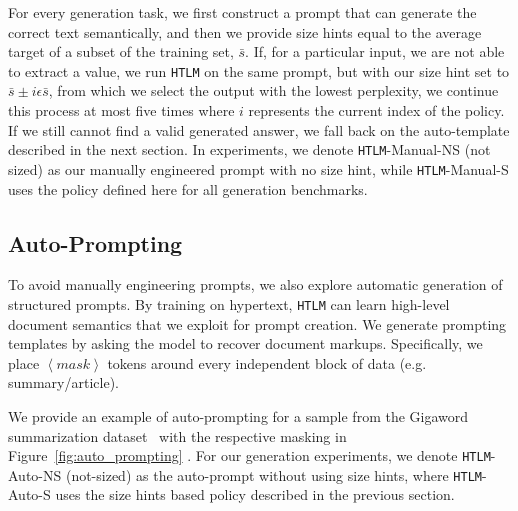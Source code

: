 \documentclass[11pt,a4paper]{article}
\newcommand{\HTLM}{\texttt{HTLM}}
\begin{document}
For every generation task, we first construct a prompt that can generate the correct text semantically, and then we provide size hints equal to the average target of a subset of the training set, $\bar s$. If, for a particular input, we are not able to extract a value, we run \HTLM{} on the same prompt, but with our size hint set to $\bar s  \pm i\epsilon \bar s$, from which we select the output with the lowest perplexity, we continue this process at most five times where $i$ represents the current index of the policy. If we still cannot find a valid generated answer, we fall back on the auto-template described in the next section. In experiments, we denote \HTLM{}-Manual-NS (not sized) as our manually engineered prompt with no size hint, while \HTLM{}-Manual-S uses the policy defined here for all generation benchmarks.


\subsection{Auto-Prompting}
To avoid manually engineering prompts, we also explore automatic generation of structured prompts.
By training on hypertext, \HTLM{} can learn high-level document semantics that we exploit for prompt creation. We generate prompting templates by asking the model to recover document markups. Specifically, we place \textit{$\left<mask\right>$} tokens around every independent block of data (e.g. summary/article).

We provide an example of auto-prompting for a sample from the Gigaword summarization dataset~\citep{gigaword} with the respective masking in Figure~\ref{fig:auto_prompting} . For our generation experiments, we denote \HTLM{}-Auto-NS (not-sized) as the auto-prompt without using size hints, where \HTLM{}-Auto-S uses the size hints based policy described in the previous section.
\end{document}
